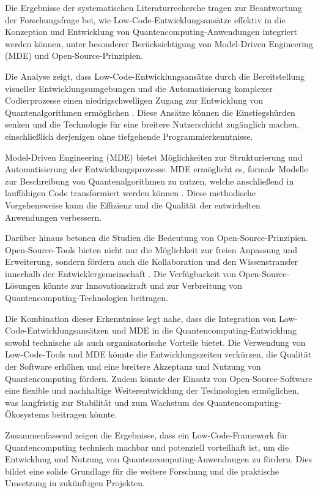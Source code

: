 Die Ergebnisse der systematischen Literaturrecherche tragen zur Beantwortung der Forschungsfrage bei, 
wie Low-Code-Entwicklungsansätze effektiv in die Konzeption und Entwicklung von Quantencomputing-Anwendungen 
integriert werden können, unter besonderer Berücksichtigung von Model-Driven Engineering (MDE) und Open-Source-Prinzipien.

Die Analyse zeigt, dass Low-Code-Entwicklungsansätze durch die Bereitstellung visueller Entwicklungsumgebungen 
und die Automatisierung komplexer Codierprozesse einen niedrigschwelligen Zugang zur Entwicklung von 
Quantenalgorithmen ermöglichen \cite{Sahay_2020, Bock_2021}. Diese Ansätze können die Einstiegshürden senken und 
die Technologie für eine breitere Nutzerschicht zugänglich machen, einschließlich derjenigen ohne tiefgehende 
Programmierkenntnisse.

Model-Driven Engineering (MDE) bietet Möglichkeiten zur Strukturierung und Automatisierung der Entwicklungsprozesse. 
MDE ermöglicht es, formale Modelle zur Beschreibung von Quantenalgorithmen zu nutzen, welche anschließend in 
lauffähigen Code transformiert werden können \cite{Gemeinhardt_2021, Pérez-Castillo_2022}. Diese methodische 
Vorgehensweise kann die Effizienz und die Qualität der entwickelten Anwendungen verbessern.

Darüber hinaus betonen die Studien die Bedeutung von Open-Source-Prinzipien. Open-Source-Tools bieten nicht nur 
die Möglichkeit zur freien Anpassung und Erweiterung, sondern fördern auch die Kollaboration und den Wissenstransfer 
innerhalb der Entwicklergemeinschaft \cite{Amato_2023, Ahmad_2023}. Die Verfügbarkeit von Open-Source-Lösungen 
könnte zur Innovationskraft und zur Verbreitung von Quantencomputing-Technologien beitragen.

Die Kombination dieser Erkenntnisse legt nahe, dass die Integration von Low-Code-Entwicklungsansätzen und MDE in 
die Quantencomputing-Entwicklung sowohl technische als auch organisatorische Vorteile bietet. Die Verwendung von 
Low-Code-Tools und MDE könnte die Entwicklungszeiten verkürzen, die Qualität der Software erhöhen und eine breitere 
Akzeptanz und Nutzung von Quantencomputing fördern. Zudem könnte der Einsatz von Open-Source-Software eine flexible 
und nachhaltige Weiterentwicklung der Technologien ermöglichen, was langfristig zur Stabilität und zum Wachstum des 
Quantencomputing-Ökosystems beitragen könnte.

Zusammenfassend zeigen die Ergebnisse, dass ein Low-Code-Framework für Quantencomputing technisch machbar und 
potenziell vorteilhaft ist, um die Entwicklung und Nutzung von Quantencomputing-Anwendungen zu fördern. Dies bildet 
eine solide Grundlage für die weitere Forschung und die praktische Umsetzung in zukünftigen Projekten.

